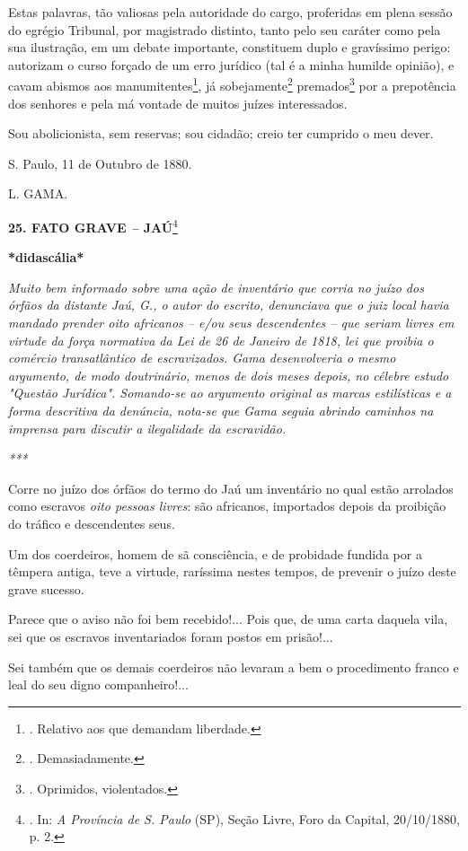 Estas palavras, tão valiosas pela autoridade do cargo, proferidas em
plena sessão do egrégio Tribunal, por magistrado distinto, tanto pelo
seu caráter como pela sua ilustração, em um debate importante,
constituem duplo e gravíssimo perigo: autorizam o curso forçado de um
erro jurídico (tal é a minha humilde opinião), e cavam abismos aos
manumitentes\footnote{. Relativo aos que demandam liberdade.}, já
sobejamente\footnote{. Demasiadamente.} premados\footnote{. Oprimidos,
  violentados.} por a prepotência dos senhores e pela má vontade de
muitos juízes interessados.

Sou abolicionista, sem reservas; sou cidadão; creio ter cumprido o meu
dever.

S. Paulo, 11 de Outubro de 1880.

L. GAMA.

\textbf{25. FATO GRAVE \emph{--} JAÚ}\footnote{. In: \emph{A Província
  de S. Paulo} (SP), Seção Livre, Foro da Capital, 20/10/1880, p. 2.}

\textbf{*didascália*}

\emph{Muito bem informado sobre uma ação de inventário que corria no
juízo dos órfãos da distante Jaú, G., o autor do escrito, denunciava que
o juiz local havia mandado prender oito africanos -- e/ou seus
descendentes -- que seriam livres em virtude da força normativa da Lei
de 26 de Janeiro de 1818, lei que proibia o comércio transatlântico de
escravizados. Gama desenvolveria o mesmo argumento, de modo doutrinário,
menos de dois meses depois, no célebre estudo "Questão Jurídica".
Somando-se ao argumento original as marcas estilísticas e a forma
descritiva da denúncia, nota-se que Gama seguia abrindo caminhos na
imprensa para discutir a ilegalidade da escravidão. }

\emph{***}

Corre no juízo dos órfãos do termo do Jaú um inventário no qual estão
arrolados como escravos \emph{oito pessoas livres}: são africanos,
importados depois da proibição do tráfico e descendentes seus.

Um dos coerdeiros, homem de sã consciência, e de probidade fundida por a
têmpera antiga, teve a virtude, raríssima nestes tempos, de prevenir o
juízo deste grave sucesso.

Parece que o aviso não foi bem recebido!... Pois que, de uma carta
daquela vila, sei que os escravos inventariados foram postos em
prisão!...

Sei também que os demais coerdeiros não levaram a bem o procedimento
franco e leal do seu digno companheiro!...

